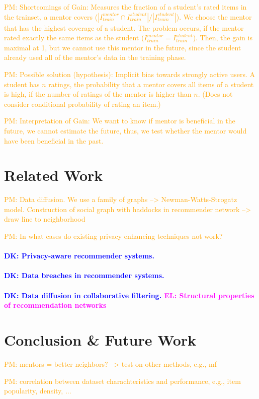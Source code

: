 \documentclass[manuscript,review,anonymous]{acmart}
\newcommand{\el}[1]{
        \textcolor{magenta}{EL: #1}}
\newcommand{\dk}[1]{
        \textcolor{blue}{DK: #1}}
\newcommand{\pmu}[1]{
        \textcolor{orange}{PM: #1}}
\begin{document}
\pmu{Shortcomings of Gain: Measures the fraction of a student's rated items in the trainset, a mentor covers ($|I^{mentor}_{train} \cap I^{student}_{train}| / |I^{student}_{train}|$). We choose the mentor that has the highest coverage of a student. The problem occurs, if the mentor rated exactly the same items as the student ($I^{mentor}_{train} = I^{student}_{train}$). Then, the gain is maximal at 1, but we cannot use this mentor in the future, since the student already used all of the mentor's data in the training phase.}
\pmu{Possible solution (hypothesis): Implicit bias towards strongly active users. A student has $n$ ratings, the probability that a mentor covers all items of a student is high, if the number of ratings of the mentor is higher than $n$. (Does not consider conditional probability of rating an item.)}
\pmu{Interpretation of Gain: We want to know if mentor is beneficial in the future, we cannot estimate the future, thus, we test whether the mentor would have been beneficial in the past.}

\section{Related Work}
\pmu{Data diffusion. We use a family of graphs --> Newman-Watts-Strogatz model. Construction of social graph with haddocks in recommender network --> draw line to neighborhood}
\pmu{In what cases do existing privacy enhancing techniques not work?}

\paragraph{\dk{Privacy-aware recommender systems.}}

\paragraph{\dk{Data breaches in recommender systems.}}

\paragraph{\dk{Data diffusion in collaborative filtering.} \el{Structural properties of recommendation networks}}

\section{Conclusion \& Future Work}
\pmu{mentors = better neighbors? --> test on other methods, e.g., mf}
\pmu{correlation between dataset charachteristics and performance, e.g., item popularity, density, ...}
\end{document}
